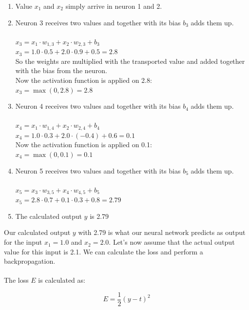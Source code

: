 \documentclass[a4paper,12pt]{report}
\begin{document}
\begin{enumerate}
  \item Value $x_1$ and $x_2$ simply arrive in neuron 1 and 2.
  \item Neuron 3 receives two values and together with its bias $b_3$ adds them up.\\\\
  $x_3 = x_1 \cdot w_{1,3} + x_2 \cdot w_{2,3} + b_3$ \\
  $x_3 = 1.0 \cdot 0.5 + 2.0 \cdot 0.9 + 0.5 = 2.8$\\
  So the weights are multiplied with the transported value and added together with the bias from the neuron.\\
  Now the activation function is applied on 2.8: \\
  $x_3 = \max(0, 2.8) = 2.8$
  
  \item Neuron 4 receives two values and together with its bias $b_4$ adds them up.\\\\
  $x_4 = x_1 \cdot w_{1,4} + x_2 \cdot w_{2,4} + b_4$ \\
  $x_4 = 1.0 \cdot 0.3 + 2.0 \cdot (-0.4) + 0.6 = 0.1$\\
  Now the activation function is applied on 0.1: \\
  $x_4 = \max(0, 0.1) = 0.1$
  
  \item Neuron 5 receives two values and together with its bias $b_5$ adds them up.\\\\
  $x_5 = x_3 \cdot w_{3,5} + x_4 \cdot w_{4,5} + b_5$ \\
  $x_5 = 2.8 \cdot 0.7 + 0.1 \cdot 0.3 + 0.8 = 2.79$
  
  \item The calculated output $y$ is 2.79
\end{enumerate}
\noindent
Our calculated output $y$ with 2.79 is what our neural network predicts as output for the input $x_1 = 1.0$ and $x_2 = 2.0$. Let’s now assume that the actual output value for this input is 2.1. We can calculate the loss and perform a backpropagation.\\\\
\noindent
The loss $E$ is calculated as:

\begin{equation}
E = \frac{1}{2}(y - t)^2
\end{equation}
\end{document}
